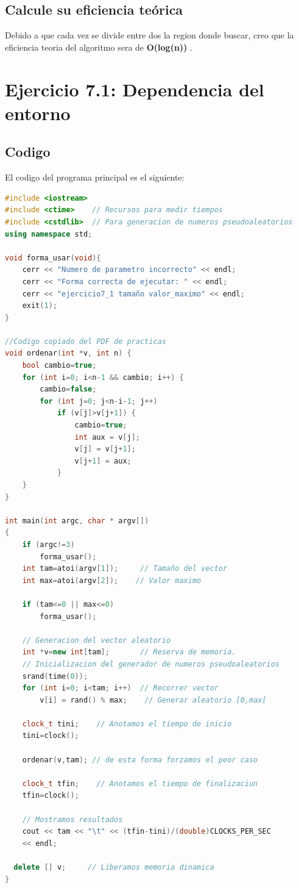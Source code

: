 \documentclass[12pt,a4psprt]{article}
\begin{document}
\subsection{Calcule su eficiencia teórica}
Debido a que cada vez  se divide entre dos la region donde buscar, creo que la eficiencia teoria del algoritmo sera de \textbf{O(log(n))} .
\section{Ejercicio 7.1: Dependencia del entorno}

\subsection{Codigo}
El codigo del programa principal es el siguiente:
\begin{lstlisting}[language=C++]
#include <iostream>
#include <ctime>    // Recursos para medir tiempos
#include <cstdlib>  // Para generacion de numeros pseudoaleatorios
using namespace std;

void forma_usar(void){
	cerr << "Numero de parametro incorrecto" << endl;
	cerr << "Forma correcta de ejecutar: " << endl;
	cerr << "ejercicio7_1 tamaño valor_maximo" << endl;
	exit(1);
}

//Codigo copiado del PDF de practicas
void ordenar(int *v, int n) {
	bool cambio=true;
	for (int i=0; i<n-1 && cambio; i++) {
		cambio=false;
		for (int j=0; j<n-i-1; j++)
			if (v[j]>v[j+1]) {
				cambio=true;
				int aux = v[j];
				v[j] = v[j+1];
				v[j+1] = aux;
			}
	}
}

int main(int argc, char * argv[])
{
	if (argc!=3)
		forma_usar();
	int tam=atoi(argv[1]);     // Tamaño del vector
	int max=atoi(argv[2]);    // Valor maximo
	
	if (tam<=0 || max<=0)
    	forma_usar();
  
	// Generacion del vector aleatorio
	int *v=new int[tam];       // Reserva de memoria.
	// Inicializacion del generador de numeros pseudoaleatorios
	srand(time(0));            
	for (int i=0; i<tam; i++)  // Recorrer vector
		v[i] = rand() % max;    // Generar aleatorio [0,max[

	clock_t tini;    // Anotamos el tiempo de inicio
	tini=clock();

	ordenar(v,tam); // de esta forma forzamos el peor caso
  
	clock_t tfin;    // Anotamos el tiempo de finalizaciun
	tfin=clock();

	// Mostramos resultados
	cout << tam << "\t" << (tfin-tini)/(double)CLOCKS_PER_SEC 
	<< endl;
  
  delete [] v;     // Liberamos memoria dinamica
}

\end{lstlisting}
\end{document}
